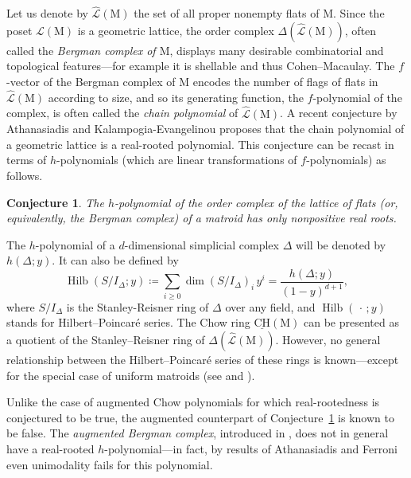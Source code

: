 \documentclass[11pt,a4paper]{amsart}
\theoremstyle{results}
\theoremstyle{definitions}
\newtheorem{conjecture}[thm]{Conjecture}
\newcommand{\ChowGr}
{\underline{\mathrm{CH}}}
\newcommand{\M}{\mathrm{M}}
\begin{document}
\medskip 

Let us denote by $\widehat{\mathcal{L}}(\M)$ the set of all proper nonempty flats of $\M$. Since the poset $\mathcal{L}(\M)$ is a geometric lattice, the order complex $\Delta(\widehat{\mathcal{L}}(\M))$, often called the \emph{Bergman complex of $\M$}, displays many desirable combinatorial and topological features---for example it is shellable and thus Cohen--Macaulay.
The $f$-vector of the Bergman complex of $\M$ encodes the number of flags of flats in $\widehat{\mathcal{L}}(\M)$ according to size, and so its generating function, the $f$-polynomial of the complex, is often called the \emph{chain polynomial} of $\widehat{\mathcal{L}}(\M)$. A recent conjecture by Athanasiadis and Kalampogia-Evangelinou \cite[Conjecture~1.2]{athanasiadis-kalampogia} proposes that the chain polynomial of a geometric lattice is a real-rooted polynomial. This conjecture can be recast in terms of $h$-polynomials (which are linear transformations of $f$-polynomials) as follows.

\begin{conjecture}\label{conj:real-rootedness-chain}
    The $h$-polynomial of the order complex of the lattice of flats (or, equivalently, the Bergman complex) of a matroid has only nonpositive real roots.
\end{conjecture}

The $h$-polynomial of a $d$-dimensional simplicial complex $\Delta$ will be denoted by $h(\Delta;y)$. 
It can also be defined by
\[
\operatorname{Hilb}(S/I_{\Delta}; y) \coloneqq \sum_{i\geqslant 0} \dim (S/I_{\Delta})_i\, y^i = \frac{h(\Delta; y)}{(1-y)^{d+1}}, 
\]
where $S/I_{\Delta}$ is the Stanley-Reisner ring of $\Delta$ over any field, and $\operatorname{Hilb}(\,\cdot\,;y)$ stands for Hilbert--Poincar\'e series. The Chow ring $\ChowGr(\M)$ can be presented as a quotient of the Stanley--Reisner ring of $\Delta(\widehat{\mathcal{L}}(\M))$. However, no general relationship between the Hilbert--Poincar\'e series of these rings is known---except for the special case of uniform matroids (see \cite[Conjecture~6.2]{hameister-rao-simpson} and \cite[Corollary~3.17]{ferroni-matherne-stevens-vecchi}).

Unlike the case of augmented Chow polynomials for which real-rootedness is conjectured to be true, the augmented counterpart of Conjecture~\ref{conj:real-rootedness-chain} is known to be false. The \emph{augmented Bergman complex}, introduced in \cite{BRADEN2022108646}, does not in general have a real-rooted $h$-polynomial---in fact, by results of Athanasiadis and Ferroni \cite[Section~4]{athanasiadis-ferroni} even unimodality fails for this polynomial. 
\end{document}

